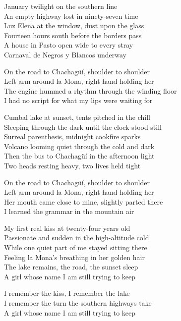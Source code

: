 \begin{lyrics}
January twilight on the southern line\\
An empty highway lost in ninety-seven time\\
Luz Elena at the window, dust upon the glass\\
Fourteen hours south before the borders pass\\
A house in Pasto open wide to every stray\\
Carnaval de Negros y Blancos underway

On the road to Chachagüí, shoulder to shoulder\\
Left arm around la Mona, right hand holding her\\
The engine hummed a rhythm through the winding floor\\
I had no script for what my lips were waiting for


Cumbal lake at sunset, tents pitched in the chill\\
Sleeping through the dark until the clock stood still\\
Surreal parenthesis, midnight cookfire sparks\\
Volcano looming quiet through the cold and dark\\
Then the bus to Chachagüí in the afternoon light\\
Two heads resting heavy, two lives held tight

On the road to Chachagüí, shoulder to shoulder\\
Left arm around la Mona, right hand holding her\\
Her mouth came close to mine, slightly parted there\\
I learned the grammar in the mountain air


My first real kiss at twenty-four years old\\
Passionate and sudden in the high-altitude cold\\
While one quiet part of me stayed sitting there\\
Feeling la Mona's breathing in her golden hair\\
The lake remains, the road, the sunset sleep\\
A girl whose name I am still trying to keep

I remember the kiss, I remember the lake\\
I remember the turn the southern highways take\\
A girl whose name I am still trying to keep
\end{lyrics}

